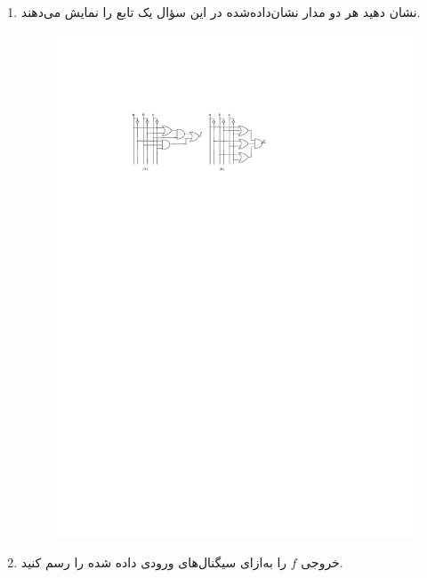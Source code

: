\begin{enumerate}
	\item 
	نشان دهید هر دو مدار نشان‌داده‌شده در این سؤال یک تابع را نمایش می‌دهند. 
	
	\begin{figure}[h]
		\centering
		\includegraphics[width=1\textwidth]{fig/Q3.pdf}
		\label{fig:Q6_a}
	\end{figure}
	
	\item 
	خروجی $f$ را به‌ازای سیگنال‌های ورودی داده شده را رسم کنید.
	

\end{enumerate}
